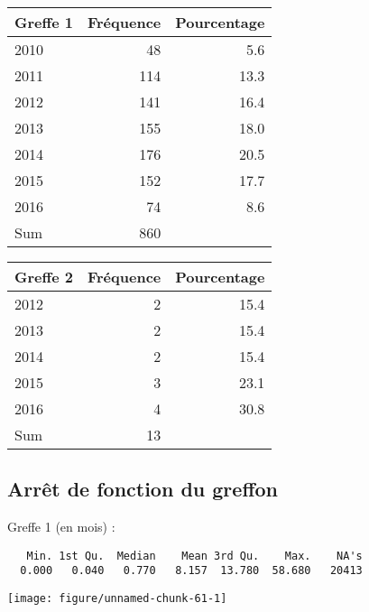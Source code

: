 \documentclass[11pt,a4paper]{article}\usepackage[]{graphicx}\usepackage[]{color}
\makeatletter
\def\maxwidth{ %
  \ifdim\Gin@nat@width>\linewidth
    \linewidth
  \else
    \Gin@nat@width
  \fi
}
\newenvironment{kframe}{%
 \def\at@end@of@kframe{}%
 \ifinner\ifhmode%
  \def\at@end@of@kframe{\end{minipage}}%
  \begin{minipage}{\columnwidth}%
 \fi\fi%
 \def\FrameCommand##1{\hskip\@totalleftmargin \hskip-\fboxsep
 \colorbox{shadecolor}{##1}\hskip-\fboxsep
     \hskip-\linewidth \hskip-\@totalleftmargin \hskip\columnwidth}%
 \MakeFramed {\advance\hsize-\width
   \@totalleftmargin\z@ \linewidth\hsize
   \@setminipage}}%
 {\par\unskip\endMakeFramed%
 \at@end@of@kframe}
\newenvironment{knitrout}{}{} %
\makeatother
\begin{document}
\begin{table}[H]
\centering
\begin{tabular}{lrr}
  \hline
Greffe 1 & Fréquence & Pourcentage \\ 
  \hline
2010 & 48 & 5.6 \\ 
  2011 & 114 & 13.3 \\ 
  2012 & 141 & 16.4 \\ 
  2013 & 155 & 18.0 \\ 
  2014 & 176 & 20.5 \\ 
  2015 & 152 & 17.7 \\ 
  2016 & 74 & 8.6 \\ 
  Sum & 860 &  \\ 
   \hline
\end{tabular}
\end{table}
\begin{table}[H]
\centering
\begin{tabular}{lrr}
  \hline
Greffe 2 & Fréquence & Pourcentage \\ 
  \hline
2012 &  2 & 15.4 \\ 
  2013 &  2 & 15.4 \\ 
  2014 &  2 & 15.4 \\ 
  2015 &  3 & 23.1 \\ 
  2016 &  4 & 30.8 \\ 
  Sum & 13 &  \\ 
   \hline
\end{tabular}
\end{table}



  \subsection{Arrêt de fonction du greffon}

Greffe 1 (en mois) :
  
\begin{knitrout}
\color{fgcolor}\begin{kframe}
\begin{verbatim}
   Min. 1st Qu.  Median    Mean 3rd Qu.    Max.    NA's 
  0.000   0.040   0.770   8.157  13.780  58.680   20413 
\end{verbatim}
\end{kframe}
\texttt{[image: figure/unnamed-chunk-61-1]} 

\end{knitrout}
\end{document}
